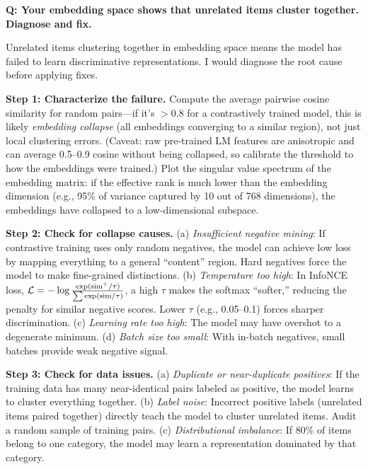 \begin{interviewq}
\textbf{Q: Your embedding space shows that unrelated items cluster together. Diagnose and fix.}

 \quad {} \quad \badgefreq{\freqmed}

\stronganswer

Unrelated items clustering together in embedding space means the model has failed to learn discriminative representations. I would diagnose the root cause before applying fixes.

\textbf{Step 1: Characterize the failure.} Compute the average pairwise cosine similarity for random pairs---if it's $>0.8$ for a contrastively trained model, this is likely \textit{embedding collapse} (all embeddings converging to a similar region), not just local clustering errors. (Caveat: raw pre-trained LM features are anisotropic and can average 0.5--0.9 cosine without being collapsed, so calibrate the threshold to how the embeddings were trained.) Plot the singular value spectrum of the embedding matrix: if the effective rank is much lower than the embedding dimension (e.g., 95\% of variance captured by 10 out of 768 dimensions), the embeddings have collapsed to a low-dimensional subspace.

\textbf{Step 2: Check for collapse causes.} (a) \textit{Insufficient negative mining}: If contrastive training uses only random negatives, the model can achieve low loss by mapping everything to a general ``content'' region. Hard negatives force the model to make fine-grained distinctions. (b) \textit{Temperature too high}: In InfoNCE loss, $\mathcal{L} = -\log \frac{\exp(\text{sim}^+/\tau)}{\sum \exp(\text{sim}/\tau)}$, a high $\tau$ makes the softmax ``softer,'' reducing the penalty for similar negative scores. Lower $\tau$ (e.g., 0.05--0.1) forces sharper discrimination. (c) \textit{Learning rate too high}: The model may have overshot to a degenerate minimum. (d) \textit{Batch size too small}: With in-batch negatives, small batches provide weak negative signal.

\textbf{Step 3: Check for data issues.} (a) \textit{Duplicate or near-duplicate positives}: If the training data has many near-identical pairs labeled as positive, the model learns to cluster everything together. (b) \textit{Label noise}: Incorrect positive labels (unrelated items paired together) directly teach the model to cluster unrelated items. Audit a random sample of training pairs. (c) \textit{Distributional imbalance}: If 80\% of items belong to one category, the model may learn a representation dominated by that category.


\end{interviewq}
